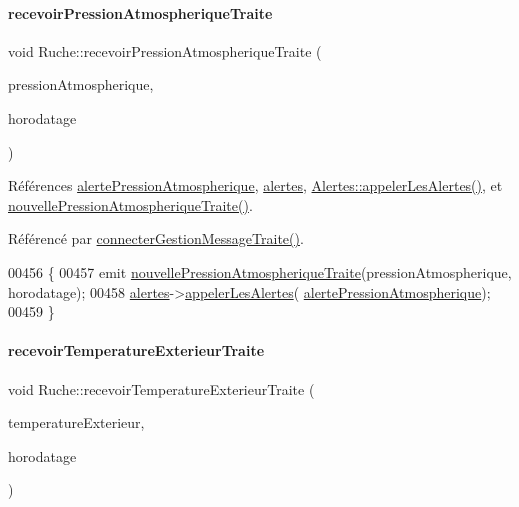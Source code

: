 \paragraph{\texorpdfstring{recevoir\+Pression\+Atmospherique\+Traite}{recevoirPressionAtmospheriqueTraite}}
{\footnotesize\ttfamily void Ruche\+::recevoir\+Pression\+Atmospherique\+Traite (\begin{DoxyParamCaption}\item[{double}]{pression\+Atmospherique,  }\item[{Q\+String}]{horodatage }\end{DoxyParamCaption})\hspace{0.3cm}{\ttfamily [slot]}}



Références \hyperlink{parametres_8h_a83a725fd153179a2bd97afcc8307737ba3b3b9fe16ae965531aca47449d865ce1}{alerte\+Pression\+Atmospherique}, \hyperlink{class_ruche_af07644ddce44cb5ed4286475dc0f9d46}{alertes}, \hyperlink{class_alertes_ad04a02dcc6e6f14da0784c7054888b05}{Alertes\+::appeler\+Les\+Alertes()}, et \hyperlink{class_ruche_ac55a1301b55166474b700ee0a2a57f22}{nouvelle\+Pression\+Atmospherique\+Traite()}.



Référencé par \hyperlink{class_ruche_a20ec8c6dc931218e5cf682050fe845d9}{connecter\+Gestion\+Message\+Traite()}.


\begin{DoxyCode}
00456 \{
00457     emit \hyperlink{class_ruche_ac55a1301b55166474b700ee0a2a57f22}{nouvellePressionAtmospheriqueTraite}(pressionAtmospherique,
      horodatage);
00458     \hyperlink{class_ruche_af07644ddce44cb5ed4286475dc0f9d46}{alertes}->\hyperlink{class_alertes_ad04a02dcc6e6f14da0784c7054888b05}{appelerLesAlertes}(
      \hyperlink{parametres_8h_a83a725fd153179a2bd97afcc8307737ba3b3b9fe16ae965531aca47449d865ce1}{alertePressionAtmospherique});
00459 \}
\end{DoxyCode}
\mbox{\label{class_ruche_a1d9b1d3aad20f206f27de4093b4a136f}} 
\paragraph{\texorpdfstring{recevoir\+Temperature\+Exterieur\+Traite}{recevoirTemperatureExterieurTraite}}
{\footnotesize\ttfamily void Ruche\+::recevoir\+Temperature\+Exterieur\+Traite (\begin{DoxyParamCaption}\item[{double}]{temperature\+Exterieur,  }\item[{Q\+String}]{horodatage }\end{DoxyParamCaption})\hspace{0.3cm}{\ttfamily [slot]}}

